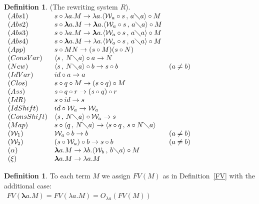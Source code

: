 \documentclass[11pt]{amsart}
\theoremstyle{plain}
\theoremstyle{definition}
\newtheorem{definition}[theorem]{Definition}
\theoremstyle{remark}
\numberwithin{equation}{section}
\newcommand{\ci}{\circ}
\newcommand{\mi}{\,,\,}
\newcommand{\is}{\diagdown}
\newcommand{\arrow}{\rightarrow}
\newcommand{\x}{a}
\newcommand{\y}{b}
\renewcommand{\pi}{\mathcal{W}}
\begin{document}
\begin{definition}(The rewriting system $R$).\\[5pt]
$
\begin{array}{lll}
(Abs1) & s\ci \lambda \x.M\rightarrow\lambda \x.\langle
\pi_{\x}\ci s\mi \x\is
\x\rangle\ci M &\\
(Abs2) & s\ci \boldsymbol{\lambda}
\x.M\rightarrow\boldsymbol{\lambda} \x.\langle \pi_{\x}\ci s\mi
\x\is
\x\rangle\ci M &\\
(Abs3) & s\ci \lambda \x.M\rightarrow\boldsymbol{\lambda}
\x.\langle \pi_{\x}\ci s\mi \x\is
\x\rangle\ci M &\\
(Abs4) & s\ci \boldsymbol{\lambda} \x.M\rightarrow\lambda
\x.\langle \pi_{\x}\ci s\mi \x\is
\x\rangle\ci M &\\
(App) & s\ci  MN\rightarrow(s\ci  M)(s\ci  N) &\\
(ConsVar) & \langle s\mi N\is \x\rangle\ci \x\rightarrow N &\\
(New) & \langle s\mi N\is \x\rangle\ci \y\rightarrow  s\ci \y & (\x\neq \y)\\
(IdVar) &  id\ci \x\rightarrow \x &\\
(Clos) & s\ci q\ci M\rightarrow (s\ci q)\ci M &\\
(Ass) & s\ci q\ci  r\rightarrow (s\ci q)\ci r &\\
(IdR) & s\ci id\rightarrow s &\\
(IdShift) & id\ci \pi_{\x}\rightarrow\pi_{\x} &\\
(ConsShift) & \langle s\mi N\is \x\rangle\ci \pi_{\x}\rightarrow s &\\
(Map) & s\ci \langle q\mi N\is \x\rangle\rightarrow\langle
s\ci q \mi s\ci N\is \x\rangle &\\
(\pi_1) & \pi_{\x}\ci \y\rightarrow \y & (\x\neq \y)\\
(\pi_2) & (s\ci\pi_{\x})\ci \y\rightarrow s\ci \y & (\x \neq
\y)\\
(\alpha) & \boldsymbol{\lambda} \x.M\rightarrow\lambda
\y.\langle\pi_{\y}\mi \y\is \x\rangle\ci M &\\
(\xi) & \boldsymbol{\lambda} \x.M\arrow\lambda \x.M &
\end{array}
$
\end{definition}
\begin{definition} To each term $M$  we assign
$FV(M)$ as in Definition~\ref{FV} with the additional case: \\
$\begin{array}{l} FV(\boldsymbol{\lambda} \x.M)=FV(\lambda
\x.M)=O_{\lambda \x}(FV(M)) \end{array}$
\end{definition}
\end{document}
